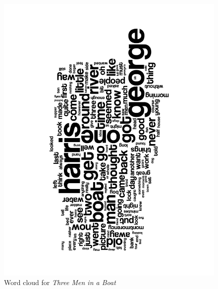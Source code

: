 \documentclass[a4paper,11pt,oneside]{book}
\begin{document}
\begin{enumerate}
\begin{figure}[htb]
\begin{center}
					\includegraphics[angle=270,width=0.8\columnwidth]{resources/wordclouds/ThreeMenInABoat_WordCloud.pdf}%
					\end{center}
					\caption{Word cloud for \emph{Three Men in a Boat}}%
					\label{wcBoat}%
				\end{figure}
\end{enumerate}
\end{document}
